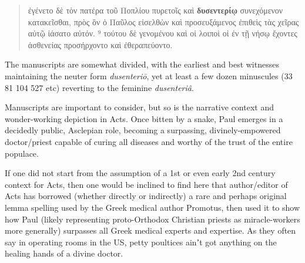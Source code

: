 \vspace*{3mm} 
 \begin{quote}ἐγένετο δὲ τὸν πατέρα τοῦ Ποπλίου πυρετοῖς καὶ \textbf{δυσεντερίῳ} %
 συνεχόμενον κατακεῖσθαι, πρὸς ὃν ὁ Παῦλος εἰσελθὼν καὶ %
 προσευξάμενος ἐπιθεὶς τὰς χεῖρας αὐτῷ ἰάσατο αὐτόν. %
⁹ τούτου δὲ γενομένου καὶ οἱ λοιποὶ οἱ ἐν τῇ νήσῳ %
ἔχοντες ἀσθενείας προσήρχοντο καὶ ἐθεραπεύοντο. \\[1mm] %
\end{quote} %
 \vspace*{3mm} 

\noindent{}The manuscripts are somewhat divided, %
with the earliest and best witnesses maintaining the neuter form \textit{dusenteriō}, %
yet at least a few dozen minuscules (33 81 104 527 etc) %
reverting to the feminine \textit{dusenteriâ}. %

Manuscripts are important to consider, %
but so is the narrative context and wonder-working depiction in Acts. %
Once bitten by a snake, Paul emerges in a decidedly public, Asclepian role, %
becoming a surpassing, divinely-empowered doctor/priest capable %
of curing all diseases and worthy of the trust of the entire populace. %

If one did not start from the assumption of a 1st or even early 2nd century context for Acts, %
then one would be inclined to find here that author/editor of Acts %
has borrowed (whether directly or indirectly) a rare and perhaps original lemma spelling %
used by the Greek medical author Promotus, %
then used it to show how Paul (likely representing proto-Orthodox Christian priests as miracle-workers more generally) %
surpasses all Greek medical experts and expertise. %
As they often say in operating rooms in the US, %
petty poultices ainʼt got anything on the healing hands of a divine doctor. %